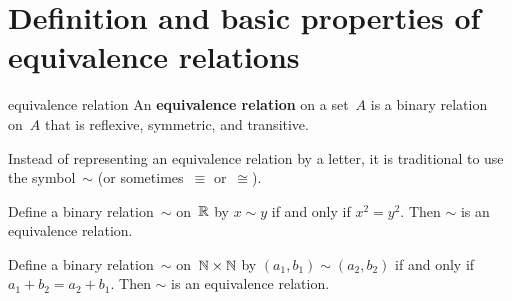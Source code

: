 \documentclass[../MATH-2000-Notes.tex]{subfiles}
\begin{document}
\section{Definition and basic properties of equivalence relations}
\begin{Definition}
    {equivalence relation}
    An \textbf{equivalence relation} on a set~$A$ is a binary relation on~$A$ that is reflexive, symmetric, and transitive.

    Instead of representing an equivalence relation by a letter, it is traditional to use the symbol~$\sim$%
    (or sometimes~$\equiv$%
    or~$\cong$).%
\end{Definition}
\begin{Questions}
    \item Define a binary relation~$\sim$ on~$\mathbb{R}$ by $x \sim y$ if and only if $x^2 = y^2$. Then $\sim$ is an equivalence relation.
    \item \label{NxNEquivRelEg}
    Define a binary relation~$\sim$ on~$\mathbb{N} \times \mathbb{N}$ by $(a_1,b_1) \sim (a_2,b_2)$ if and only if $a_1 + b_2 = a_2 + b_1$. Then $\sim$ is an equivalence relation.

\end{Questions}
\end{document}
